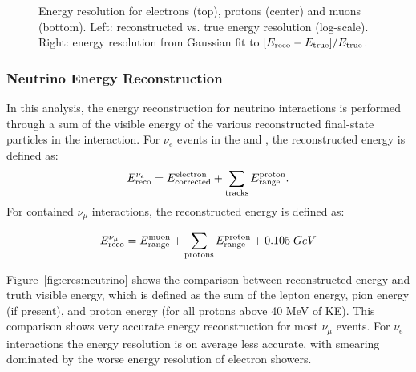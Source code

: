 \begin{figure}[H]
\begin{center}
\begin{subfigure}[b]{0.38\textwidth}
    \end{subfigure}
\caption{\label{fig:eres:particle}Energy resolution for electrons (top), protons (center) and muons (bottom). Left: reconstructed vs. true energy resolution (log-scale). Right: energy resolution from Gaussian fit to $[E_{\rm reco}-E_{\rm true}] / E_{\rm true}$.}
\end{center}
\end{figure}

\subsubsection{Neutrino Energy Reconstruction}

\par In this analysis, the energy reconstruction for neutrino interactions is performed through a sum of the visible energy of the various reconstructed final-state particles in the interaction. For $\nu_e$ events in the \zpsel and \npsel, the reconstructed energy is defined as:
\begin{equation}
    E_{\rm reco}^{\nu_e} = E_{\rm corrected}^{\rm electron} + \sum_{\rm tracks} E_{\rm range}^{\rm proton}.
\end{equation}{}
For contained $\nu_{\mu}$ interactions, the reconstructed energy is defined as:

\begin{equation}
    E_{\rm reco}^{\nu_{\mu}} = E_{\rm range}^{\rm muon} + \sum_{\rm protons} E_{\rm range}^{\rm proton} + 0.105 \; GeV
\end{equation}{}

Figure~\ref{fig:eres:neutrino} shows the comparison between reconstructed energy and truth visible energy, which is defined as the sum of the lepton energy, pion energy (if present), and proton energy (for all protons above 40 MeV of KE). This comparison shows very accurate energy reconstruction for most $\nu_{\mu}$ events. For $\nu_e$ interactions the energy resolution is on average less accurate, with smearing dominated by the worse energy resolution of electron showers.

